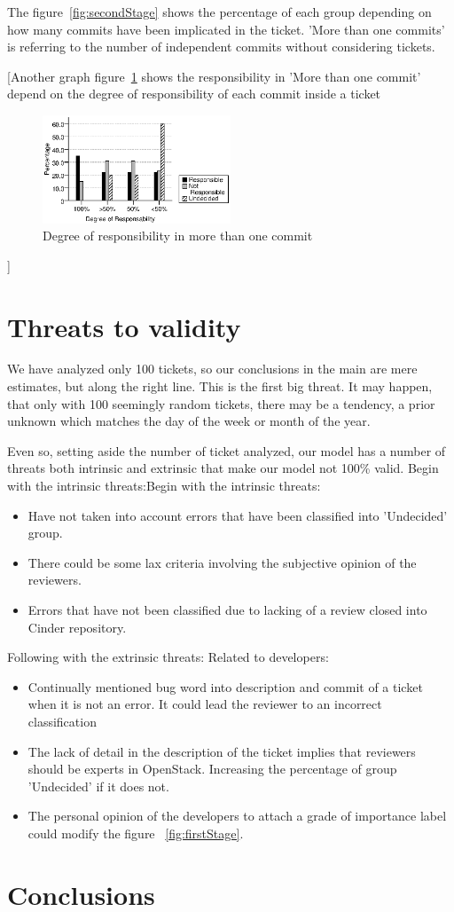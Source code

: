 \documentclass[a4paper]{article}
\begin{document}
The figure~\ref{fig:secondStage} shows the percentage of each group depending on how many commits have been implicated in the ticket. 'More than one commits' is referring to the number of independent commits without considering tickets.

[Another graph  figure~\ref{fig:degree}  shows the responsibility in 'More than one commit' depend on the degree of responsibility of each commit inside a ticket
\begin{figure}[htb]
\centering
\includegraphics[width=0.5\textwidth]{prueba} 
\caption{Degree of responsibility in more than one commit} \label{fig:degree}
\end{figure}
]

\section{Threats to validity}

We have analyzed only 100 tickets, so our conclusions in the main are mere estimates, but along the right line. This is the first big threat. It may happen, that only with 100 seemingly random tickets, there may be a tendency, a prior unknown which matches the day of the week or month of the year.

Even so, setting aside the number of ticket analyzed, our model has a number of threats both intrinsic and extrinsic that make our model not 100\% valid. Begin with the intrinsic threats:Begin with the intrinsic threats:

\begin{itemize}
	\item Have not taken into account errors that have been classified into 'Undecided' group.
	\item There could be some lax criteria involving the subjective opinion of the reviewers. 
	\item Errors that have not been classified due to lacking of a review closed into Cinder repository.
\end{itemize}
	
Following with the extrinsic threats:
	Related to developers:
\begin{itemize}
	\item Continually mentioned bug word into description and commit of a ticket when it is not an error. It could lead the reviewer to an incorrect classification
	\item The lack of detail in the description of the ticket implies that reviewers should be experts in OpenStack. Increasing the percentage of group 'Undecided' if it does not. 
	\item The personal opinion of the developers to attach a grade of importance label could modify the figure ~\ref{fig:firstStage}.
\end{itemize}

\section{Conclusions}
\end{document}
